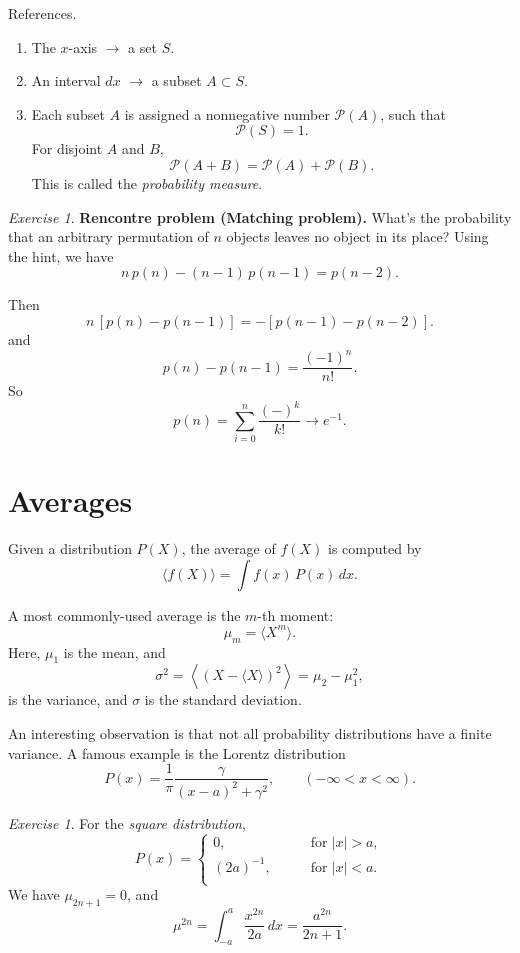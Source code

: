 \documentclass{book}
\numberwithin{equation}{section}
\theoremstyle{plain}
\theoremstyle{definition}
\theoremstyle{remark}
\theoremstyle{BoldStyle}
\newtheorem{exercise}{Exercise}
\newtheorem*{exercise*}{Exercise}
\numberwithin{exercise}{section}
\begin{document}
References\cite{kolmogorov}.

\begin{enumerate}
\item The $x$-axis $\rightarrow$ a set $S$.
\item An interval $dx$ $\rightarrow$ a subset $A \subset S$.
\item Each subset $A$ is assigned
  a nonnegative number $\mathcal P(A)$, such that
  $$
  \mathcal P(S) = 1.
  $$
  For disjoint $A$ and $B$,
  $$
  \mathcal P(A + B) = \mathcal P(A) + \mathcal P(B).
  $$
  This is called the \emph{probability measure}.
\end{enumerate}

\begin{exercise*}
{\bf Rencontre problem (Matching problem).}
%
What's the probability that an arbitrary permutation
of $n$ objects leaves no object in its place?
%
Using the hint, we have
$$
n \, p(n) - (n-1) \, p(n-1) = p(n-2).
$$

Then
$$
n \, [p(n) - p(n-1)] = - [ p(n-1) - p(n-2)].
$$
and
$$
p(n) - p(n-1) = \frac{ (-1)^{n} }{n!}.
$$
So
$$
p(n) = \sum_{i = 0}^n \frac{ (-)^{k} } { k! } \rightarrow e^{-1}.
$$

\end{exercise*}


\section{Averages}

Given a distribution $P(X)$, the average of $f(X)$ is computed by
$$
\langle f(X) \rangle
=
\int f(x) \, P(x) \, dx.
$$

A most commonly-used average is the $m$-th moment:
$$
\mu_m = \langle X^m \rangle.
$$
Here, $\mu_1$ is the mean, and
\begin{equation}
\sigma^2 =
\left\langle
  (X - \langle X \rangle )^2
\right\rangle
= \mu_2 - \mu_1^2,
\end{equation}
is the variance, and $\sigma$ is the standard deviation.

An interesting observation is that
not all probability distributions have a finite variance.
%
A famous example is the Lorentz distribution
\begin{equation}
P(x) = \frac{1}{\pi} \frac{\gamma}{ (x-a)^2 + \gamma^2 },
\qquad (-\infty < x < \infty).
\end{equation}


\begin{exercise}
For the \emph{square distribution},
\begin{equation}
P(x) =
\begin{cases}
  0,          \qquad &\mathrm{for\;} |x| > a, \\
  (2a)^{-1},  \qquad &\mathrm{for\;} |x| < a. \\
\end{cases}
\end{equation}
We have $\mu_{2n+1} = 0$, and
$$
\mu^{2n}
=
\int_{-a}^a \frac{x^{2n}}{2a} \, dx
=
\frac{ a^{2n} }{ 2n + 1 }.
$$
\end{exercise}
\end{document}
